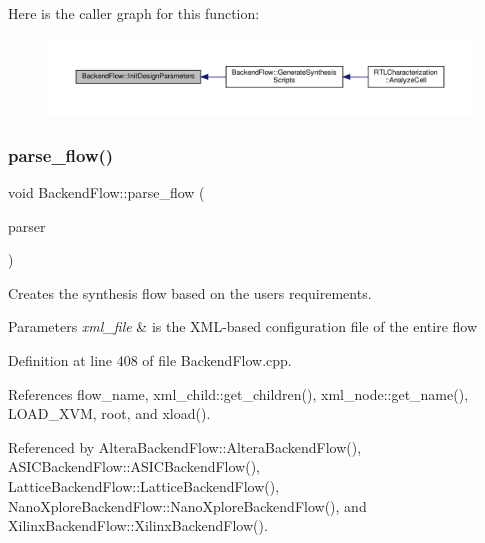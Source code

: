 Here is the caller graph for this function\+:
\nopagebreak
\begin{figure}[H]
\begin{center}
\leavevmode
\includegraphics[width=350pt]{da/d75/classBackendFlow_a367d9917dc257ed6aa0bb5e97f57d2d4_icgraph}
\end{center}
\end{figure}
\mbox{\label{classBackendFlow_a70e196e669a5be2bc954b4aec6852add}} 
\subsubsection{\texorpdfstring{parse\+\_\+flow()}{parse\_flow()}}
{\footnotesize\ttfamily void Backend\+Flow\+::parse\+\_\+flow (\begin{DoxyParamCaption}\item[{const \hyperlink{xml__dom__parser_8hpp_a5e6373a495d2b6b4aef3179a48a4ceaf}{X\+M\+L\+Dom\+Parser\+Ref}}]{parser }\end{DoxyParamCaption})}



Creates the synthesis flow based on the user\textquotesingle{}s requirements. 


\begin{DoxyParams}{Parameters}
{\em xml\+\_\+file} & is the X\+M\+L-\/based configuration file of the entire flow \\
\hline
\end{DoxyParams}


Definition at line 408 of file Backend\+Flow.\+cpp.



References flow\+\_\+name, xml\+\_\+child\+::get\+\_\+children(), xml\+\_\+node\+::get\+\_\+name(), L\+O\+A\+D\+\_\+\+X\+VM, root, and xload().



Referenced by Altera\+Backend\+Flow\+::\+Altera\+Backend\+Flow(), A\+S\+I\+C\+Backend\+Flow\+::\+A\+S\+I\+C\+Backend\+Flow(), Lattice\+Backend\+Flow\+::\+Lattice\+Backend\+Flow(), Nano\+Xplore\+Backend\+Flow\+::\+Nano\+Xplore\+Backend\+Flow(), and Xilinx\+Backend\+Flow\+::\+Xilinx\+Backend\+Flow().


